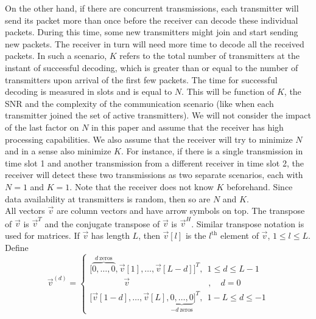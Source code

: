 \documentclass[10pt, a4paper, twocolumn]{IEEEtran}
\begin{document}
\noindent On the other hand, if there are concurrent transmissions, each transmitter will send its packet more than once before the receiver can decode these individual packets. During this time, some new transmitters might join and start sending new packets. The receiver in turn will need more time to decode all the received packets. In such a scenario, $K$ refers to the total number of transmitters at the instant of successful decoding, which is greater than or equal to the number of transmitters upon arrival of the first few packets. The time for successful decoding is measured in slots and is equal to $N$. This will be function of $K$, the SNR and the complexity of the communication scenario (like when each transmitter joined the set of active transmitters). We will not consider the impact of the last factor on $N$ in this paper and assume that the receiver has high processing capabilities. We also assume that the receiver will try to minimize $N$ and in a sense also minimize $K$. For instance, if there is a single transmission in time slot 1 and another transmission from a different receiver in time slot 2, the receiver will detect these two transmissions as two separate scenarios, each with $N=1$ and $K=1$. Note that the receiver does not know $K$ beforehand. Since data availability at transmitters is random, then so are $N$ and $K$.\\

\noindent All vectors $\overrightarrow{v}$ are column vectors and have arrow symbols on top. The transpose of $\overrightarrow{v}$ is $\overrightarrow{v}^T$ and the conjugate transpose of $\overrightarrow{v}$ is $\overrightarrow{v}^H$. Similar transpose notation is used for matrices. If $\overrightarrow{v}$ has length $L$, then $\overrightarrow{v}[l]$ is the $l^{\text{th}}$ element of $\overrightarrow{v}$, $1\leq l\leq L$. Define
\begin{equation*}
\overrightarrow{v}^{(d)} = \begin{cases}
\big[\overbrace{0, \dots, 0}^{d~\text{zeros}}, \overrightarrow{v}[1], \dots, \overrightarrow{v}[L-d]\big]^T,~~1\leq d\leq L-1\\
\quad\quad\quad\quad\overrightarrow{v}\quad\quad\quad\quad\quad\quad\quad\quad\quad~,\quad d=0\\
\big[\overrightarrow{v}[1-d], \dots, \overrightarrow{v}[L],\underbrace{0, \dots, 0}_{-d~\text{zeros}}\big]^T,~~1-L\leq d\leq -1
\end{cases}
\end{equation*}
\end{document}
